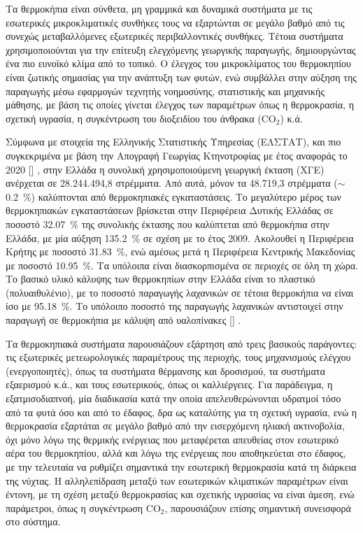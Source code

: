 \documentclass[12pt, a4paper]{report} %
\DeclareRobustCommand{\lcitep}[1]{%
  \english{[\cite{#1}]}%
}
\newcommand{\english}{\foreignlanguage{english}}
\begin{document}
Τα θερμοκήπια είναι σύνθετα, μη γραμμικά και δυναμικά συστήματα με τις εσωτερικές μικ\-ροκλιματικές συνθήκες 
τους να εξαρτώνται σε μεγάλο βαθμό από τις συνεχώς μεταβαλλόμενες εξωτερικές περιβαλλοντικές συνθήκες. 
Τέτοια συστήματα χρησιμοποιούνται για την επίτευξη ελεγχόμενης γεωργικής παραγωγής, δημιουργώντας ένα πιο 
ευνοϊκό κλίμα από το τοπικό. Ο έλεγχος του μικροκλίματος του θερμοκηπίου είναι ζωτικής σημασίας για την 
ανάπτυξη των φυτών, ενώ συμβάλλει στην αύξηση της παραγωγής μέσω εφαρμογών τεχνητής νοημοσύνης, στατιστικής 
και μηχανικής μάθησης, με βάση τις οποίες γίνεται έλεγχος των παραμέτρων όπως η θερμοκρασία, η σχετική υγρασία, η 
συγκέντρωση του διοξειδίου του άνθρακα (\english{CO$_2$}) κ.ά.

Σύμφωνα με στοιχεία της Ελληνικής Στατιστικής Υπηρεσίας (ΕΛΣΤΑΤ), και πιο συγκεκριμένα με βάση την 
Απογραφή Γεωργίας Κτηνοτροφίας με έτος αναφοράς το 2020 \lcitep{eisagwgi_NN_bib7}, στην Ελλάδα η 
συνολική χρησιμοποιούμενη γεωργική έκταση (ΧΓΕ) ανέρχεται σε 28.244.494,8 στρέμματα. Από αυτά, 
μόνον τα 48.719,3 στρέμματα ($\sim$\SI{0.2}{\percent}) καλύπτονται από θερμοκηπιακές εγκαταστάσεις. 
Το μεγαλύτερο μέρος των θερμοκηπιακών εγκαταστάσεων βρίσκεται στην Περιφέρεια Δυτικής Ελλάδας σε 
ποσοστό \SI{32,07}{\percent} της συνολικής έκτασης που καλύπτεται από θερμοκήπια στην Ελλάδα, με 
μία αύξηση \SI{135,2}{\percent} σε σχέση με το έτος 2009. Ακολουθεί η Περιφέρεια Κρήτης με ποσοστό 
\SI{31,83}{\percent}, ενώ αμέσως μετά η Περιφέρεια Κεντρικής Μακεδονίας με ποσοστό \SI{10,95}{\percent}. 
Τα υπόλοιπα είναι διασκορπισμένα σε περιοχές σε όλη τη χώρα. Το βασικό υλικό κάλυψης των θερμοκηπίων στην 
Ελλάδα είναι το πλαστικό (πολυαιθυλένιο), με το ποσοστό παραγωγής λαχανικών σε τέτοια θερμοκήπια να 
είναι ίσο με \SI{95,18}{\percent}. Το υπόλοιπο ποσοστό της παραγωγής λαχανικών αντιστοιχεί στην παραγωγή 
σε θερμοκήπια με κάλυψη από υαλοπίνακες \lcitep{eisagwgi_NN_bib8,eisagwgi_NN_bib9}.

Τα θερμοκηπιακά συστήματα παρουσιάζουν εξάρτηση από τρεις βασικούς παράγοντες: τις εξωτερικές 
μετεωρολογικές παραμέτρους της περιοχής, τους μηχανισμούς ελέγχου (ενεργοποιητές), όπως τα συστήματα θέρμανσης και 
δροσισμού, τα συστήματα εξαερισμού κ.ά., και τους εσωτερικούς, όπως οι καλλιέργειες. Για παράδειγμα, η 
εξατμισοδιαπνοή, μία διαδικασία κατά την οποία απελευθερώνονται υδρατμοί τόσο από τα φυτά όσο και από το 
έδαφος, δρα ως καταλύτης για τη σχετική υγρασία, ενώ η θερμοκρασία εξαρτάται σε μεγάλο βαθμό από την 
εισερχόμενη ηλιακή ακτινοβολία, όχι μόνο λόγω της θερμικής ενέργειας που μεταφέρεται απευθείας στον εσωτερικό 
αέρα του θερμοκηπίου, αλλά και λόγω της ενέργειας που αποθηκεύεται στο έδαφος, με την τελευταία να ρυθμίζει 
σημαντικά την εσωτερική θερμοκρασία κατά τη διάρκεια της νύχτας. Η αλληλεπίδραση μεταξύ των εσωτερικών 
κλιματικών παραμέτρων είναι έντονη, με τη σχέση μεταξύ θερμοκρασίας και σχετικής υγρασίας να είναι άμεση, 
ενώ παράμετροι, όπως η συγκέντρωση \english{CO$_2$}, παρουσιάζουν επίσης σημαντική συνεισφορά στο σύστημα.
\end{document}
